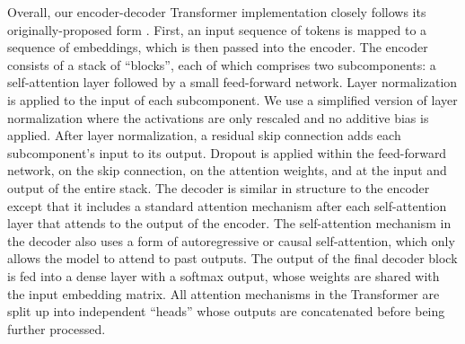\documentclass[twoside,11pt]{article}
\begin{document}
Overall, our encoder-decoder Transformer implementation closely follows its originally-proposed form \citep{vaswani2017attention}.
First, an input sequence of tokens is mapped to a sequence of embeddings, which is then passed into the encoder.
The encoder consists of a stack of ``blocks'', each of which comprises two subcomponents: a self-attention layer followed by a small feed-forward network.
Layer normalization \citep{ba2016layer} is applied to the input of each subcomponent.
We use a simplified version of layer normalization where the activations are only rescaled and no additive bias is applied.
After layer normalization, a residual skip connection \citep{he2016deep} adds each subcomponent's input to its output.
Dropout \citep{srivastava2014dropout} is applied within the feed-forward network, on the skip connection, on the attention weights, and at the input and output of the entire stack.
The decoder is similar in structure to the encoder except that it includes a standard attention mechanism after each self-attention layer that attends to the output of the encoder.
The self-attention mechanism in the decoder also uses a form of autoregressive or causal self-attention, which only allows the model to attend to past outputs.
The output of the final decoder block is fed into a dense layer with a softmax output, whose weights are shared with the input embedding matrix.
All attention mechanisms in the Transformer are split up into independent ``heads'' whose outputs are concatenated before being further processed.
\end{document}
